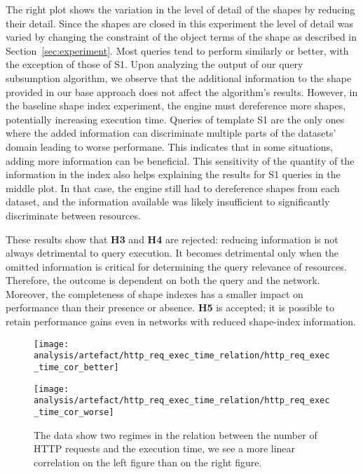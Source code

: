 The right plot shows the variation in the level of detail of the shapes by reducing their detail.
Since the shapes are closed in this experiment the level of detail was varied by changing the constraint of the object terms of the shape as described in Section~\ref{sec:experiment}.
Most queries tend to perform similarly or better, with the exception of those of S1.
Upon analyzing the output of our query subsumption algorithm, we observe that the additional information to the shape provided in our base approach does not affect the algorithm's results.
However, in the baseline shape index experiment, the engine must dereference more shapes, potentially increasing execution time.
Queries of template S1 are the only ones where the added information can discriminate multiple parts of the datasets' domain leading to worse performane.
This indicates that in some situations, adding more information can be beneficial.
This sensitivity of the quantity of the information in the index also helps explaining the results for S1 queries in the middle plot. 
In that case, the engine still had to dereference shapes from each dataset, and the information available was likely insufficient to significantly discriminate between resources.

These results show that \textbf{H3} and \textbf{H4} are rejected: reducing information is not always detrimental to query execution.
It becomes detrimental only when the omitted information is critical for determining the query relevance of resources. 
Therefore, the outcome is dependent on both the query and the network. 
Moreover, the completeness of shape indexes has a smaller impact on performance than their presence or absence.
\textbf{H5} is accepted; it is possible to retain performance gains even in networks with reduced shape-index information.

\begin{figure}[htbp]
    \centering
    \begin{minipage}[t]{1.0\linewidth}
        \centering
        \texttt{[image: analysis/artefact/http\_req\_exec\_time\_relation/http\_req\_exec\_time\_cor\_better]}
        \label{fig:http_req_exec_time_cor_better}
    \end{minipage}
    \hspace{0.05\textwidth}
    \begin{minipage}[t]{1.0\linewidth}
        \centering
        \texttt{[image: analysis/artefact/http\_req\_exec\_time\_relation/http\_req\_exec\_time\_cor\_worse]}
        \label{fig:http_req_exec_time_cor_worse}
    \end{minipage}

    \caption{
        The data show two regimes in the relation between the number of HTTP requests and the execution time, 
        we see a more linear correlation on the left figure than on the right figure.
        }
    \label{fig:http_req_exec_time_cor}
\end{figure}


